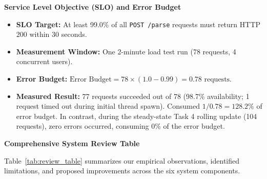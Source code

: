 \documentclass[10pt,a4paper]{article}
\begin{document}
\textbf{Service Level Objective (SLO) and Error Budget}
\begin{itemize}
    \item \textbf{SLO Target:} At least 99.0\% of all \texttt{POST /parse} requests must return HTTP 200 within 30 seconds.
    \item \textbf{Measurement Window:} One 2-minute load test run (78 requests, 4 concurrent users).
    \item \textbf{Error Budget:} $\text{Error Budget} = 78 \times (1.0 - 0.99) = 0.78\text{ requests}$.
    \item \textbf{Measured Result:} 77 requests succeeded out of 78 (98.7\% availability; 1 request timed out during initial thread spawn). Consumed $1 / 0.78 = 128.2\%$ of error budget. In contrast, during the steady-state Task 4 rolling update (104 requests), zero errors occurred, consuming 0\% of the error budget.
\end{itemize}

\textbf{Comprehensive System Review Table}

Table~\ref{tab:review_table} summarizes our empirical observations, identified limitations, and proposed improvements across the six system components.

\clearpage
\end{document}

